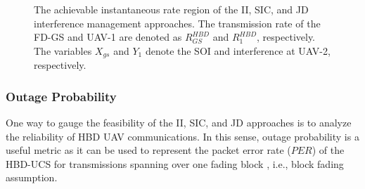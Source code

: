 \begin{figure}[]
\centering
{}
\hfil
{}
\hfil
{}
\caption{The achievable instantaneous rate region of the II, SIC, and JD interference management approaches. The transmission rate of the FD-GS and UAV-1 are denoted as $R_{GS}^{HBD}$ and $R_{1}^{HBD}$, respectively. The variables $X_{gs}$ and $Y_1$ denote the SOI and interference at UAV-2, respectively.}
\label{fig:lit_review_rate_regions}
\end{figure}

\subsubsection{Outage Probability}
One way to gauge the feasibility of the II, SIC, and JD approaches is to analyze the reliability of HBD UAV communications. In this sense, outage probability is a useful metric as it can be used to represent the packet error rate ($PER$) of the HBD-UCS for transmissions spanning over one fading block \cite{ernest2019outage, lin2013outage}, i.e., block fading assumption. 

